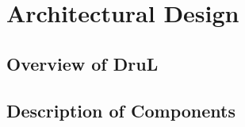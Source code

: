 


\chapter{Architectural Design}


\section{Overview of DruL}


\section{Description of Components}